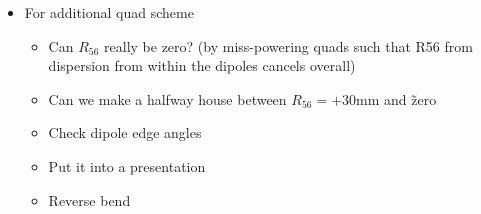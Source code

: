 
\begin{itemize}
    \item For additional quad scheme
    \begin{itemize}
        \item Can $R_{56}$ really be zero? (by miss-powering quads such that R56 from dispersion from within the dipoles cancels overall)
        \item Can we make a halfway house between $R_{56} = +30$mm and \~ zero
        \item Check dipole edge angles
        \item Put it into a presentation
        \item Reverse bend
    \end{itemize}
\end{itemize}